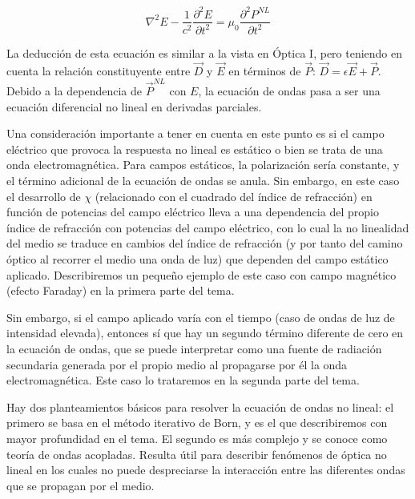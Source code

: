 \documentclass[12pt,a4paper]{report}
\newcommand{\esp}{\vspace{0.5cm}}
\begin{document}
	\esp
	
	\begin{equation}
		\nabla^2 E - \frac{1}{c^2} \frac{\partial^2 E}{\partial t^2} = \mu_0 \frac{\partial^2 P^{NL}}{\partial t^2}
	\end{equation}
	
	\esp
	
	La deducción de esta ecuación es similar a la vista en Óptica I, pero teniendo en cuenta la relación constituyente entre $\vec{D}$ y $\vec{E}$ en términos de $\vec{P}$: $\vec{D} = \epsilon \vec{E} + \vec{P}$. Debido a la dependencia de $\vec{P}^{NL}$ con $E$, la ecuación de ondas pasa a ser una ecuación diferencial no lineal en derivadas parciales.
	
	\esp
	
	Una consideración importante a tener en cuenta en este punto es si el campo eléctrico que provoca la respuesta no lineal es estático o bien se trata de una onda electromagnética. Para campos estáticos, la polarización sería constante, y el término adicional de la ecuación de ondas se anula. Sin embargo, en este caso el desarrollo de $\chi$ (relacionado con el cuadrado del índice de refracción) en función de potencias del campo eléctrico lleva a una dependencia del propio índice de refracción con potencias del campo eléctrico, con lo cual la no linealidad del medio se traduce en cambios del índice de refracción (y por tanto del camino óptico al recorrer el medio una onda de luz) que dependen del campo estático aplicado. Describiremos un pequeño ejemplo de este caso con campo magnético (efecto Faraday) en la primera parte del tema.
	
	\esp
	
	Sin embargo, si el campo aplicado varía con el tiempo (caso de ondas de luz de intensidad elevada), entonces sí que hay un segundo término diferente de cero en la ecuación de ondas, que se puede interpretar como una fuente de radiación secundaria generada por el propio medio al propagarse por él la onda electromagnética. Este caso lo trataremos en la segunda parte del tema.
	
	\esp
	
	Hay dos planteamientos básicos para resolver la ecuación de ondas no lineal: el primero se basa en el método iterativo de Born, y es el que describiremos con mayor profundidad en el tema. El segundo es más complejo y se conoce como teoría de ondas acopladas. Resulta útil para describir fenómenos de óptica no lineal en los cuales no puede despreciarse la interacción entre las diferentes ondas que se propagan por el medio.
	
\end{document}
